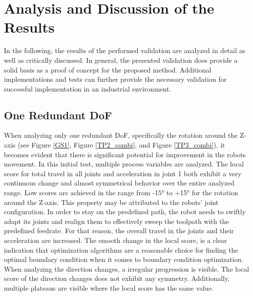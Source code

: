 


\newpage
\section{Analysis and Discussion of the Results}%
In the following, the results of the performed validation are analyzed in detail as well as critically discussed.
In general, the presented validation does provide a solid basis as a proof of concept for the proposed method. Additional implementations and tests can further provide the necessary validation for successful implementation in an industrial environment.
\subsection{One Redundant DoF}
When analyzing only one redundant \acrshort{DoF}, specifically the rotation around the Z-axis (see Figure \ref{GS1}, Figure \ref{TP2_combi}, and Figure \ref{TP3_combi}), it becomes evident that there is significant potential for improvement in the robots movement. In this initial test, multiple process variables are analyzed. The local score for total travel in all joints and acceleration in joint 1 both exhibit a very continuous change and almost symmetrical behavior over the entire analyzed range. Low scores are achieved in the range from -15° to +15° for the rotation around the Z-axis. This property may be attributed to the robots' joint configuration. In order to stay on the predefined path, the robot needs to swiftly adapt its joints and realign them to effectively sweep the toolpath with the predefined feedrate. For that reason, the overall travel in the joints and their acceleration are increased. 
The smooth change in the local score, is a clear indication that optimization algorithms are a reasonable choice for finding the optimal boundary condition when it comes to boundary condition optimization. When analyzing the direction changes, a irregular progression is visible. The local score of the direction changes does not exhibit any symmetry. Additionally, multiple plateaus are visible where the local score has the same value. 
